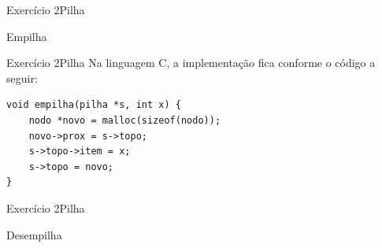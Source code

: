 \documentclass[aspectratio=169]{beamer}
\begin{document}

\begin{frame}[fragile]{Exercício 2}{Pilha}
\begin{algorithm}[H]
\caption{Empilha} 
\label{Empilha}
\end{algorithm}
\end{frame}


\begin{frame}[fragile]{Exercício 2}{Pilha}
Na linguagem C, a implementação fica conforme o código a seguir:
\begin{lstlisting}[style=CStyle]
void empilha(pilha *s, int x) {
    nodo *novo = malloc(sizeof(nodo));
    novo->prox = s->topo;
    s->topo->item = x;
    s->topo = novo;
}
\end{lstlisting}  
\end{frame}


\begin{frame}[fragile]{Exercício 2}{Pilha}
\begin{algorithm}[H]
\caption{Desempilha} 
\label{Desempilha}
\end{algorithm}
\end{frame}

\end{document}
